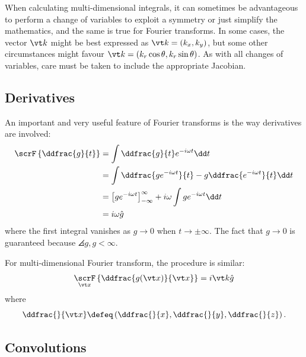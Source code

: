 \documentclass[
  a4paper,             %
  11pt,                %
  oneside,             %
  onecolumn,           %
  bibliography=totoc,  %
  final,               %
]{scrartcl}
\DeclareMathOperator{\FT}{\scrF}
\begin{document}
When calculating multi-dimensional integrals, it can sometimes be advantageous
to perform a change of variables to exploit a symmetry or just simplify the
mathematics, and the same is true for Fourier transforms.  In some cases, the
vector \(\vt k\) might be best expressed as \(\vt k = (k_{x}, k_{y})\), but some
other circumstances might favour \(\vt k = (k_{r} \cos \theta, k_{r} \sin
\theta)\).  As with all changes of variables, care must be taken to include the
appropriate Jacobian.

\subsection{Derivatives}
\label{subsec:derivatives}

An important and very useful feature of Fourier transforms is the way
derivatives are involved:
\begin{align}
  \FT\left\{ \ddfrac{g}{t} \right\}
  &= \int \ddfrac{g}{t} e^{-i \omega t} \dd t \\
  &= \int \ddfrac{g e^{-i \omega t}}{t} - g \ddfrac{e^{-i \omega t}}{t} \dd t \\
  &= \left[ g e^{-i \omega t} \right]_{-\infty}^{\infty} + i \omega \int g e^{-i \omega t} \dd t \\
  &= i \omega \hat g
\end{align}
where the first integral vanishes as \(g \to 0\) when \(t \to \pm \infty\).  The
fact that \(g \to 0\) is guaranteed because \(\angles{g, g} < \infty\).

For multi-dimensional Fourier transform, the procedure is similar:
\begin{equation}
  \FT_{\vt x}\left\{ \ddfrac{g(\vt x)}{\vt x} \right\} = i \vt k \hat g
\end{equation}
where
\begin{equation}
  \ddfrac{}{\vt x} \defeq \left( \ddfrac{}{x}, \ddfrac{}{y}, \ddfrac{}{z} \right).
\end{equation}

\subsection{Convolutions}
\label{subsec:convolutions}
\end{document}
